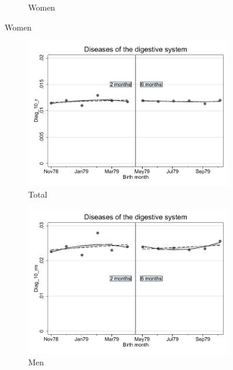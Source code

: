 \documentclass[a4paper ]{article}
\begin{document}
\begin{figure}[h!]
\begin{subfigure}[t]{0.31\textwidth}
		\caption{Women}
	\end{subfigure}
\end{figure}
\newpage
\begin{figure}[h]
	\centering
	\begin{subfigure}[t]{0.31\textwidth}
		\centering
		\includegraphics[width=0.99\textwidth]{R1_RD_Diag_10_r_fits}
		\caption{Total}		
	\end{subfigure}
	\begin{subfigure}[t]{0.31\textwidth}
		\centering
		\includegraphics[width=0.99\textwidth]{R1_RD_Diag_10_rm_fits}
		\caption{Men}		
	\end{subfigure}
	\quad
	\begin{subfigure}[t]{0.31\textwidth}

\end{subfigure}
\end{figure}
\end{document}
